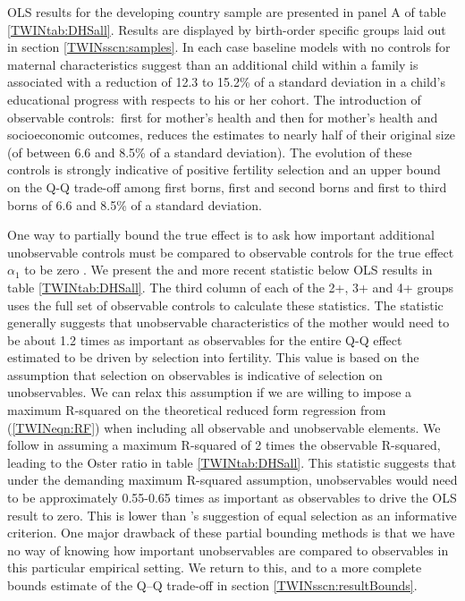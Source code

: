 \documentclass[subeqn]{article}
\begin{document}
\begin{spacing}{1.4}
OLS results for the developing country sample are presented in panel A of table
\ref{TWINtab:DHSall}.  Results are displayed by birth-order specific groups
laid out in section \ref{TWINsscn:samples}.  In each case baseline models with
no controls for maternal characteristics suggest than an additional child
within a family is associated with a reduction of 12.3 to 15.2\% of a standard
deviation in a child's educational progress with respects to his or her cohort.
The introduction of observable controls:\ first for mother's health and then for
mother's health and socioeconomic outcomes, reduces the estimates to nearly half
of their original size (of between 6.6 and 8.5\% of a standard deviation). The
evolution of these controls is strongly indicative of positive fertility
selection and an upper bound on the Q-Q trade-off among first borns, first and
second borns and first to third borns of 6.6 and 8.5\% of a standard deviation.

One way to partially bound the true effect is to ask how important additional
unobservable controls must be compared to observable controls for the true
effect $\alpha_1$ to be zero \citep{Altonjietal2005,Oster2013}.  We present the
\citeauthor{Altonjietal2005} and more recent \citeauthor{Oster2013} statistic
below OLS results in table \ref{TWINtab:DHSall}.  The third column of each of
the 2+, 3+ and 4+ groups uses the full set of observable controls to calculate
these statistics.  The \citeauthor{Altonjietal2005} statistic generally
suggests that unobservable characteristics of the mother would need to be about
1.2 times as important as observables for the entire Q-Q effect estimated to
be driven by selection into fertility.  This value is based on the assumption
that selection on observables is indicative of selection on unobservables.  We
can relax this assumption if we are willing to impose a maximum R-squared on the 
theoretical reduced form regression from (\ref{TWINeqn:RF}) when including all 
observable and unobservable elements.  We follow \citet{Oster2013} in assuming
a maximum R-squared of 2 times the observable R-squared, leading to the Oster
ratio in table \ref{TWINtab:DHSall}.  This statistic suggests that under the
demanding maximum R-squared assumption, unobservables would need to be
approximately 0.55-0.65 times as important as observables to drive the OLS
result to zero. This is lower than \citeauthor{Oster2013}'s suggestion of equal
selection as an informative criterion.  One major drawback of these partial
bounding methods is that we have no way of knowing how important unobservables
are compared to observables in this particular empirical setting. We return to
this, and to a more complete bounds estimate of the Q--Q trade-off in section
\ref{TWINsscn:resultBounds}.


\end{spacing}
\end{document}

